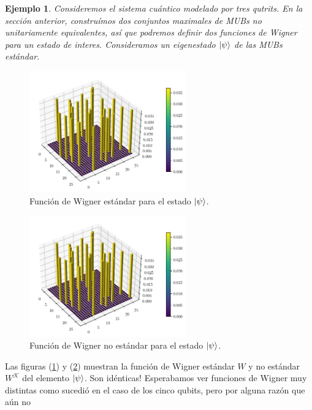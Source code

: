\documentclass[a4paper]{report}
\newtheorem{example}{Ejemplo}
\begin{document}
  \clearpage
  \begin{example}
    Consideremos el sistema cuántico modelado por tres
    qutrits. En la sección anterior, construímos dos
    conjuntos maximales de MUBs no unitariamente
    equivalentes, así que podremos definir dos funciones de
    Wigner para un estado de interes. Consideramos un
    eigenestado $\ket{\psi}$  de las MUBs estándar.
  \end{example}
  \begin{figure}[ht]
    \centering
    \includegraphics[width=0.6\textwidth]{
    imgs/wigner-standard-3-3-s1.png}
    \caption{Función de Wigner estándar para el estado
    $\ket{\psi}$.}
    \label{fig:wigner-standard-3-3-s1}
  \end{figure}
  \begin{figure}[ht]
    \centering
    \includegraphics[width=0.6\textwidth]{
    imgs/wigner-standard-3-3-s1.png}
    \caption{Función de Wigner no estándar para el estado
    $\ket{\psi}$.}
    \label{fig:wigner-kantor-3-3-s1}
  \end{figure}
  Las figuras (\ref{fig:wigner-standard-3-3-s1}) y
  (\ref{fig:wigner-kantor-3-3-s1}) muestran la función de
  Wigner estándar $W$ y no estándar $W^{\mathcal K}$ del
  elemento $\ket{\psi}$. Son idénticas! Esperabamos ver
  funciones de Wigner muy distintas como sucedió en el caso
  de los cinco qubits, pero por alguna razón que aún no
\end{document}
